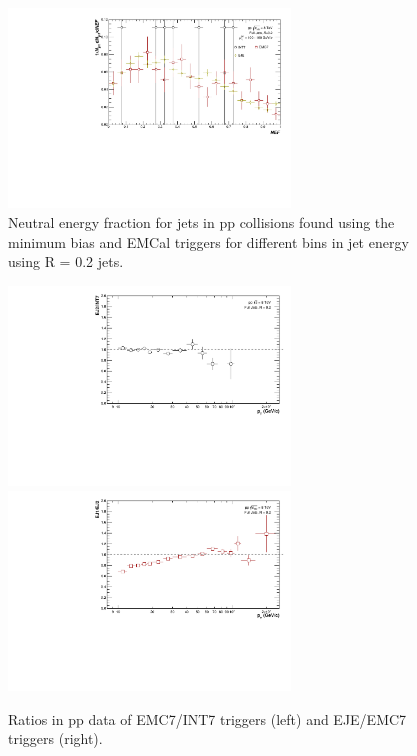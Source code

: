 \documentclass[ALICE]{ALICE_analysis_notes}
\newcommand{\pp}{pp\xspace}
\providecommand{\DIFaddbeginFL}{} %
\providecommand{\DIFaddendFL}{} %
\providecommand{\DIFdelbeginFL}{} %
\providecommand{\DIFdelendFL}{} %
\newcommand{\DIFscaledelfig}{0.5}
\newlength{\DIFdelgraphicswidth} %
\newlength{\DIFdelgraphicsheight} %
\newcommand{\DIFaddincludegraphics}[2][]{{\color{blue}\fbox{\DIFOincludegraphics[#1]{#2}}}} %
\newcommand{\DIFdelincludegraphics}[2][]{%
\sbox{\DIFdelgraphicsbox}{\DIFOincludegraphics[#1]{#2}}%
\settoboxwidth{\DIFdelgraphicswidth}{\DIFdelgraphicsbox} %
\settoboxtotalheight{\DIFdelgraphicsheight}{\DIFdelgraphicsbox} %
\scalebox{\DIFscaledelfig}{%
\parbox[b]{\DIFdelgraphicswidth}{\usebox{\DIFdelgraphicsbox}\\[-\baselineskip] \rule{\DIFdelgraphicswidth}{0em}}\llap{\resizebox{\DIFdelgraphicswidth}{\DIFdelgraphicsheight}{%
\setlength{\unitlength}{\DIFdelgraphicswidth}%
\begin{picture}(1,1)%
\thicklines\linethickness{2pt} %
{\color[rgb]{1,0,0}\put(0,0){\framebox(1,1){}}}%
{\color[rgb]{1,0,0}\put(0,0){\line( 1,1){1}}}%
{\color[rgb]{1,0,0}\put(0,1){\line(1,-1){1}}}%
\end{picture}%
}\hspace*{3pt}}} %
} %
\DeclareRobustCommand{\DIFaddbeginFL}{\DIFOaddbeginFL \let\includegraphics\DIFaddincludegraphics} %
\DeclareRobustCommand{\DIFaddendFL}{\DIFOaddendFL \let\includegraphics\DIFOincludegraphics} %
\DeclareRobustCommand{\DIFdelbeginFL}{\DIFOdelbeginFL \let\includegraphics\DIFdelincludegraphics} %
\DeclareRobustCommand{\DIFdelendFL}{\DIFOaddendFL \let\includegraphics\DIFOincludegraphics} %
\begin{document}
\begin{figure}[h!]
\begin{multicols}{2}
            \includegraphics[width=7.5cm]{figures/NEF/All/hNEF_100-160GeV_R02.pdf}
        \vfill\null
    \end{multicols}
    \caption{Neutral energy fraction for jets in \pp collisions found using the minimum bias and EMCal triggers for different bins in jet energy using R = 0.2 jets.}
    \label{fig:NEF}
\end{figure}

\begin{figure}[h!]
    \centering
    \begin{multicols}{2}
            \DIFdelbeginFL %
\DIFdelendFL \DIFaddbeginFL \includegraphics[width=7.5cm]{figures/TriggerSwap/ratio_EMCINT_data_R02.pdf}
        \DIFaddendFL \vfill\null 
        \columnbreak
            \DIFdelbeginFL %
\DIFdelendFL \DIFaddbeginFL \includegraphics[width=7.5cm]{figures/TriggerSwap/ratio_EJEEMC_data_R02.pdf}
        \DIFaddendFL \vfill\null
    \end{multicols}
    \caption{Ratios in \pp data of EMC7/INT7 triggers (left) and EJE/EMC7 triggers (right).}
    \label{fig:trigger_ratios}
\end{figure}
\end{document}

